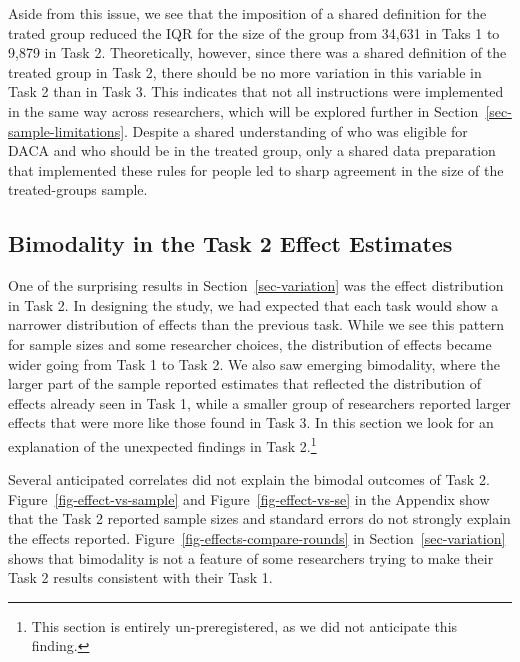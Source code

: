 \documentclass[
  letterpaper,
  DIV=11,
  numbers=noendperiod]{scrartcl}
\begin{document}
Aside from this issue, we see that the imposition of a shared definition
for the trated group reduced the IQR for the size of the group from
34,631 in Taks 1 to 9,879 in Task 2. Theoretically, however, since there
was a shared definition of the treated group in Task 2, there should be
no more variation in this variable in Task 2 than in Task 3. This
indicates that not all instructions were implemented in the same way
across researchers, which will be explored further in
Section~\ref{sec-sample-limitations}. Despite a shared understanding of
who was eligible for DACA and who should be in the treated group, only a
shared data preparation that implemented these rules for people led to
sharp agreement in the size of the treated-groups sample.

\subsection{Bimodality in the Task 2 Effect
Estimates}\label{sec-bimodal}

One of the surprising results in Section~\ref{sec-variation} was the
effect distribution in Task 2. In designing the study, we had expected
that each task would show a narrower distribution of effects than the
previous task. While we see this pattern for sample sizes and some
researcher choices, the distribution of effects became wider going from
Task 1 to Task 2. We also saw emerging bimodality, where the larger part
of the sample reported estimates that reflected the distribution of
effects already seen in Task 1, while a smaller group of researchers
reported larger effects that were more like those found in Task 3. In
this section we look for an explanation of the unexpected findings in
Task 2.\footnote{This section is entirely un-preregistered, as we did
  not anticipate this finding.}

Several anticipated correlates did not explain the bimodal outcomes of
Task 2. Figure~\ref{fig-effect-vs-sample} and
Figure~\ref{fig-effect-vs-se} in the Appendix show that the Task 2
reported sample sizes and standard errors do not strongly explain the
effects reported. Figure~\ref{fig-effects-compare-rounds} in
Section~\ref{sec-variation} shows that bimodality is not a feature of
some researchers trying to make their Task 2 results consistent with
their Task 1.
\end{document}
